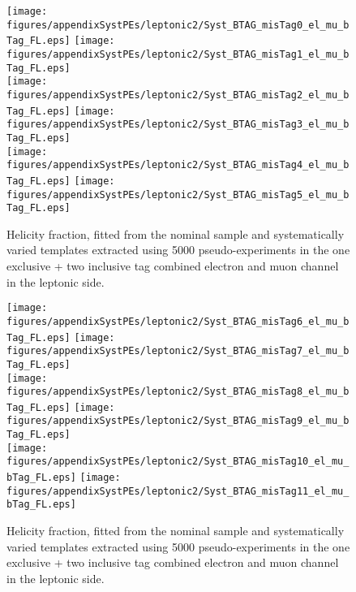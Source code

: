 \begin{figure}[!hb]
\begin{center}
        \texttt{[image: figures/appendixSystPEs/leptonic2/Syst\_BTAG\_misTag0\_el\_mu\_bTag\_FL.eps]}
        \texttt{[image: figures/appendixSystPEs/leptonic2/Syst\_BTAG\_misTag1\_el\_mu\_bTag\_FL.eps]}\\
        \texttt{[image: figures/appendixSystPEs/leptonic2/Syst\_BTAG\_misTag2\_el\_mu\_bTag\_FL.eps]}
        \texttt{[image: figures/appendixSystPEs/leptonic2/Syst\_BTAG\_misTag3\_el\_mu\_bTag\_FL.eps]}\\
        \texttt{[image: figures/appendixSystPEs/leptonic2/Syst\_BTAG\_misTag4\_el\_mu\_bTag\_FL.eps]}
        \texttt{[image: figures/appendixSystPEs/leptonic2/Syst\_BTAG\_misTag5\_el\_mu\_bTag\_FL.eps]}
        
\caption{Helicity fraction, \fl fitted from the nominal \ttbar sample and systematically varied templates extracted using 5000 pseudo-experiments in the one exclusive + two inclusive \bt tag combined electron and muon channel in the leptonic side. }
\label{fig:systematicVar_lep_fL_elmu2incl_btag3_1}
\end{center}
\end{figure}

\begin{figure}[!hb]
\begin{center}
        \texttt{[image: figures/appendixSystPEs/leptonic2/Syst\_BTAG\_misTag6\_el\_mu\_bTag\_FL.eps]}
        \texttt{[image: figures/appendixSystPEs/leptonic2/Syst\_BTAG\_misTag7\_el\_mu\_bTag\_FL.eps]}\\
        \texttt{[image: figures/appendixSystPEs/leptonic2/Syst\_BTAG\_misTag8\_el\_mu\_bTag\_FL.eps]}
        \texttt{[image: figures/appendixSystPEs/leptonic2/Syst\_BTAG\_misTag9\_el\_mu\_bTag\_FL.eps]}\\
        \texttt{[image: figures/appendixSystPEs/leptonic2/Syst\_BTAG\_misTag10\_el\_mu\_bTag\_FL.eps]}
        \texttt{[image: figures/appendixSystPEs/leptonic2/Syst\_BTAG\_misTag11\_el\_mu\_bTag\_FL.eps]}
        
\caption{Helicity fraction, \fl fitted from the nominal \ttbar sample and systematically varied templates extracted using 5000 pseudo-experiments in the one exclusive + two inclusive \bt tag combined electron and muon channel in the leptonic side. }
\label{fig:systematicVar_lep_fL_elmu2incl_btag3_2}
\end{center}
\end{figure}

